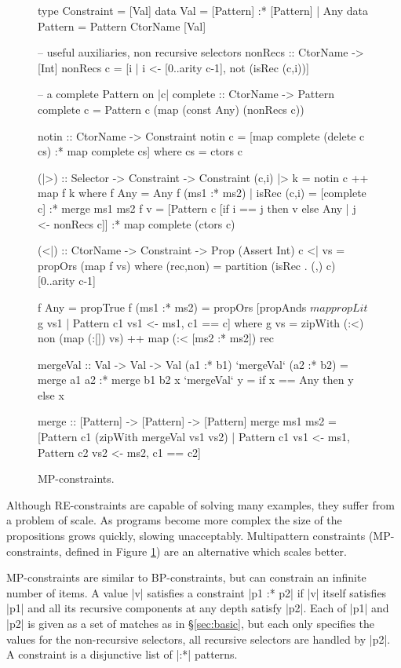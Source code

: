 \begin{figure}
\begin{code}
type Constraint  =  [Val]
data Val         =  [Pattern] :* [Pattern] |  Any
data Pattern     =  Pattern CtorName [Val]

-- useful auxiliaries, non recursive selectors
nonRecs :: CtorName -> [Int]
nonRecs c = [i | i <- [0..arity c-1], not (isRec (c,i))]

-- a complete Pattern on |c|
complete :: CtorName -> Pattern
complete c = Pattern c (map (const Any) (nonRecs c))

notin :: CtorName -> Constraint
notin c = [map complete (delete c cs) :* map complete cs]
    where cs = ctors c

(|>) :: Selector -> Constraint -> Constraint
(c,i) |> k = notin c ++ map f k
    where
    f Any = Any
    f (ms1 :* ms2) | isRec (c,i) = [complete c] :* merge ms1 ms2
    f v =  [Pattern c [if i == j then v else Any | j <- nonRecs c]]
           :* map complete (ctors c)

(<|) :: CtorName -> Constraint -> Prop (Assert Int)
c <| vs = propOrs (map f vs)
    where
    (rec,non) = partition (isRec . (,) c) [0..arity c-1]

    f Any = propTrue
    f (ms1 :* ms2) =  propOrs  [propAnds $ map propLit $ g vs1
                               | Pattern c1 vs1 <- ms1, c1 == c]
        where g vs =  zipWith (:<) non (map (:[]) vs) ++
                      map (:< [ms2 :* ms2]) rec

mergeVal :: Val -> Val -> Val
(a1 :* b1)  `mergeVal`  (a2 :* b2)  = merge a1 a2 :* merge b1 b2
x           `mergeVal`  y           = if x == Any then y else x

merge :: [Pattern] -> [Pattern] -> [Pattern]
merge  ms1 ms2 = [Pattern c1 (zipWith mergeVal vs1 vs2) |
       Pattern c1 vs1 <- ms1, Pattern c2 vs2 <- ms2, c1 == c2]
\end{code}
\caption{MP-constraints.}
\label{fig:enumeration}
\figureend
\end{figure}

Although RE-constraints are capable of solving many examples, they suffer from a problem of scale. As programs become more complex the size of the propositions grows quickly, slowing \catch{} unacceptably. Multipattern constraints (MP-constraints, defined in Figure \ref{fig:enumeration}) are an alternative which scales better.

MP-constraints are similar to BP-constraints, but can constrain an infinite number of items. A value |v| satisfies a constraint |p1 :* p2| if |v| itself satisfies |p1| and all its recursive components at any depth satisfy |p2|. Each of |p1| and |p2| is given as a set of matches as in \S\ref{sec:basic}, but each  only specifies the values for the non-recursive selectors, all recursive selectors are handled by |p2|. A constraint is a disjunctive list of |:*| patterns.

